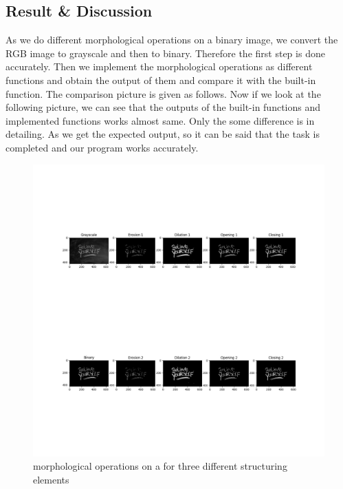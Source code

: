\documentclass{article}
\begin{document}
{    \subsection{Result & Discussion}{
        As we do different morphological operations on a binary image, we convert the RGB image to grayscale and then to binary. Therefore the first step is done accurately. Then we implement the morphological operations as different functions and obtain the output of them and compare it with the built-in function. The comparison picture is given as follows. Now if we look at the following picture, we can see that the outputs of the built-in functions and implemented functions works almost same. Only the some difference is in detailing. As we get the expected output, so it can be said that the task is completed and our program works accurately.
        
        \begin{figure}[htp]
            \centering
            \includegraphics[width=1.0\textwidth]{Assignment-9/fig-1.jpg}
            \caption{morphological operations on a for three different structuring elements}
        \end{figure}
    }
}
\clearpage
\end{document}
